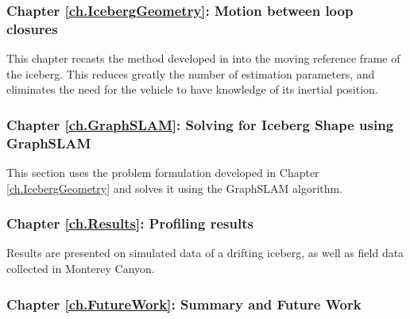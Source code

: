 \subsubsection*{Chapter \ref{ch.IcebergGeometry}: Motion between loop closures}  This chapter recasts the method developed in \cite{Kimball2011b} into the moving reference frame of the iceberg. This reduces greatly the number of estimation parameters, and eliminates the need for the vehicle to have knowledge of its inertial position.

\subsubsection*{Chapter \ref{ch.GraphSLAM}: Solving for Iceberg Shape using GraphSLAM} This section uses the problem formulation developed in Chapter \ref{ch.IcebergGeometry} and solves it using the GraphSLAM algorithm.

\subsubsection*{Chapter \ref{ch.Results}: Profiling results} Results are presented on simulated data of a drifting iceberg, as well as field data collected in Monterey Canyon. 

\subsubsection*{Chapter \ref{ch.FutureWork}: Summary and Future Work}

